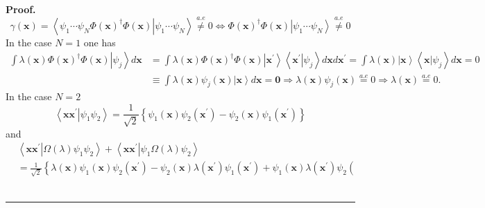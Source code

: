 \documentclass[aps,preprint]{revtex4}%
\newenvironment{proof}[1][Proof]{\noindent\textbf{#1.} }{\ \rule{0.5em}{0.5em}}
\begin{document}
\begin{proof}
\begin{equation}
\gamma\left(  \mathbf{x}\right)  =\left\langle \psi_{1}\cdots\psi_{N}\left.
\Phi\left(  \mathbf{x}\right)  ^{\dagger}\Phi\left(  \mathbf{x}\right)
\right\vert \psi_{1}\cdots\psi_{N}\right\rangle \overset{a.e}{\neq
}0\Longleftrightarrow\Phi\left(  \mathbf{x}\right)  ^{\dagger}\Phi\left(
\mathbf{x}\right)  \left\vert \psi_{1}\cdots\psi_{N}\right\rangle
\overset{a.e}{\neq}0
\end{equation}
In the case $N=1$ one has%
\begin{align}
\int\lambda\left(  \mathbf{x}\right)  \Phi\left(  \mathbf{x}\right)
^{\dagger}\Phi\left(  \mathbf{x}\right)  \left\vert \psi_{j}\right\rangle
d\mathbf{x}  &  =\int\lambda\left(  \mathbf{x}\right)  \Phi\left(
\mathbf{x}\right)  ^{\dagger}\Phi\left(  \mathbf{x}\right)  \left\vert
\mathbf{x}^{\prime}\right\rangle \left\langle \left.  \mathbf{x}^{\prime
}\right\vert \psi_{j}\right\rangle d\mathbf{x}d\mathbf{x}^{\prime}=\int%
\lambda\left(  \mathbf{x}\right)  \left\vert \mathbf{x}\right\rangle
\left\langle \left.  \mathbf{x}\right\vert \psi_{j}\right\rangle
d\mathbf{x}=0\nonumber\\
&  \equiv\int\lambda\left(  \mathbf{x}\right)  \psi_{j}\left(  \mathbf{x}%
\right)  \left\vert \mathbf{x}\right\rangle d\mathbf{x=0\Rightarrow}%
\lambda\left(  \mathbf{x}\right)  \psi_{j}\left(  \mathbf{x}\right)
\overset{a.e}{=}0\Rightarrow\lambda\left(  \mathbf{x}\right)  \overset{a.e}{=}%
0.
\end{align}
In the case $N=2$
\begin{equation}
\left\langle \left.  \mathbf{xx}^{\prime}\right\vert \psi_{1}\psi
_{2}\right\rangle =\frac{1}{\sqrt{2}}\left\{  \psi_{1}\left(  \mathbf{x}%
\right)  \psi_{2}\left(  \mathbf{x}^{\prime}\right)  -\psi_{2}\left(
\mathbf{x}\right)  \psi_{1}\left(  \mathbf{x}^{\prime}\right)  \right\}
\end{equation}
and%
\begin{align}
&  \left\langle \left.  \mathbf{xx}^{\prime}\right\vert \Omega\left(
\lambda\right)  \psi_{1}\psi_{2}\right\rangle +\left\langle \left.
\mathbf{xx}^{\prime}\right\vert \psi_{1}\Omega\left(  \lambda\right)  \psi
_{2}\right\rangle \nonumber\\
&  =\frac{1}{\sqrt{2}}\left\{  \lambda\left(  \mathbf{x}\right)  \psi
_{1}\left(  \mathbf{x}\right)  \psi_{2}\left(  \mathbf{x}^{\prime}\right)
-\psi_{2}\left(  \mathbf{x}\right)  \lambda\left(  \mathbf{x}^{\prime}\right)
\psi_{1}\left(  \mathbf{x}^{\prime}\right)  +\psi_{1}\left(  \mathbf{x}%
\right)  \lambda\left(  \mathbf{x}^{\prime}\right)  \psi_{2}\left(

\end{align}
\end{proof}
\end{document}
